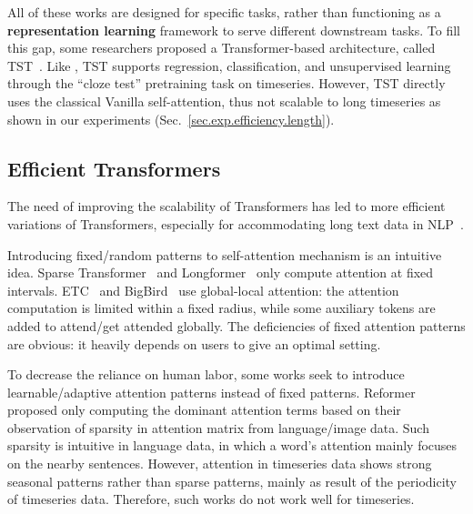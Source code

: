 All of these works are designed for specific tasks, rather than functioning as a {\bf representation learning} framework to serve different downstream tasks. To fill this gap, some researchers proposed a Transformer-based architecture, called TST~\cite{DBLP:conf/kdd/ZerveasJPBE21}. Like \system, TST supports regression, classification, and unsupervised learning through the ``cloze test'' pretraining task on timeseries. 
However, TST directly uses the classical Vanilla self-attention, thus not scalable to long timeseries as shown in our experiments (Sec.~\ref{sec.exp.efficiency.length}).

\subsection{Efficient Transformers}
The need of improving the scalability of Transformers has led to more efficient variations of Transformers, especially for accommodating long text data in NLP~\cite{tay2020efficient}. 

Introducing fixed/random patterns to self-attention mechanism is an intuitive idea. Sparse Transformer~\cite{child2019generating} and Longformer~\cite{beltagy2020longformer} only compute attention at fixed intervals. ETC~\cite{ainslie2020etc} and BigBird~\cite{zaheer2020big} use global-local attention: the attention computation is limited within a fixed radius, while some auxiliary tokens are added to attend/get attended globally. 
The deficiencies of fixed attention patterns are obvious: it heavily depends on users to give an optimal setting.
  

To decrease the reliance on human labor, some works seek to introduce learnable/adaptive attention patterns instead of fixed patterns. Reformer~\cite{kitaev2020reformer} proposed  only computing the dominant attention terms based on their observation of sparsity in attention matrix from language/image data. Such sparsity is intuitive in language data, in which a word's attention mainly focuses on the nearby sentences. However, attention in timeseries data shows strong seasonal patterns rather than sparse patterns, mainly as result of  the periodicity of timeseries data. Therefore, such works do not work well for timeseries.

